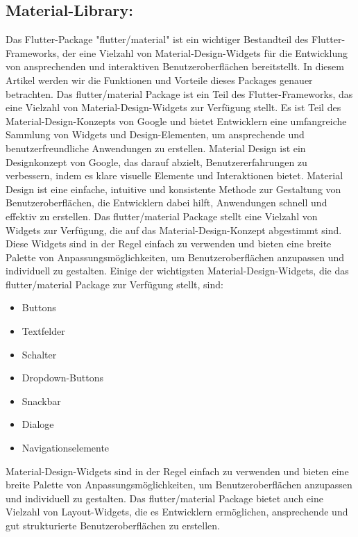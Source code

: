 \subsection*{Material-Library:}
Das Flutter-Package "flutter/material" ist ein wichtiger Bestandteil des Flutter-Frameworks, der eine Vielzahl von Material-Design-Widgets für die Entwicklung von ansprechenden und interaktiven Benutzeroberflächen bereitstellt. 
In diesem Artikel werden wir die Funktionen und Vorteile dieses Packages genauer betrachten.
Das flutter/material Package ist ein Teil des Flutter-Frameworks, das eine Vielzahl von Material-Design-Widgets zur Verfügung stellt. 
Es ist Teil des Material-Design-Konzepts von Google und bietet Entwicklern eine umfangreiche Sammlung von Widgets und Design-Elementen, um ansprechende und benutzerfreundliche Anwendungen zu erstellen.
Material Design ist ein Designkonzept von Google, das darauf abzielt, Benutzererfahrungen zu verbessern, indem es klare visuelle Elemente und Interaktionen bietet. 
Material Design ist eine einfache, intuitive und konsistente Methode zur Gestaltung von Benutzeroberflächen, die Entwicklern dabei hilft, Anwendungen schnell und effektiv zu erstellen.
\newline
Das flutter/material Package stellt eine Vielzahl von Widgets zur Verfügung, die auf das Material-Design-Konzept abgestimmt sind. 
Diese Widgets sind in der Regel einfach zu verwenden und bieten eine breite Palette von Anpassungsmöglichkeiten, um Benutzeroberflächen anzupassen und individuell zu gestalten.
Einige der wichtigsten Material-Design-Widgets, die das flutter/material Package zur Verfügung stellt, sind:
\begin{itemize}
    \item Buttons
    \item Textfelder
    \item Schalter
    \item Dropdown-Buttons
    \item Snackbar
    \item Dialoge
    \item Navigationselemente
\end{itemize}
Material-Design-Widgets sind in der Regel einfach zu verwenden und bieten eine breite Palette von Anpassungsmöglichkeiten, 
um Benutzeroberflächen anzupassen und individuell zu gestalten.
\newline
Das flutter/material Package bietet auch eine Vielzahl von Layout-Widgets, die es Entwicklern ermöglichen, ansprechende und gut strukturierte Benutzeroberflächen zu erstellen. 
